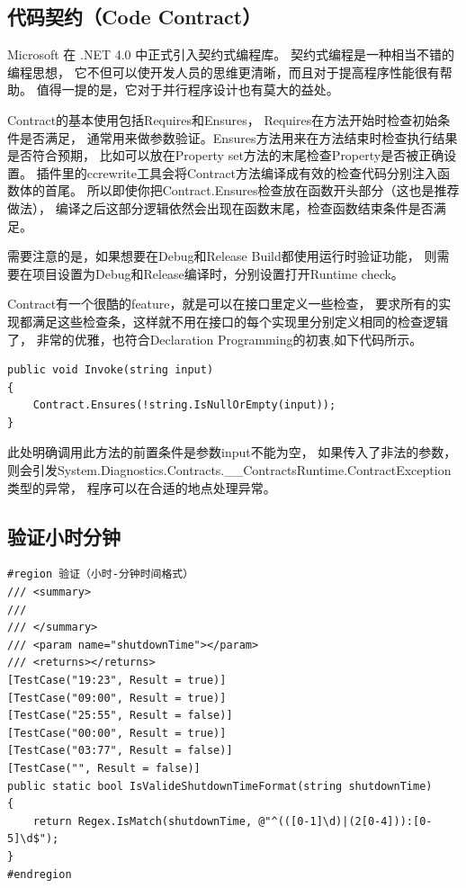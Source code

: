 \documentclass{book}
\begin{document}
\subsection{代码契约（Code Contract）}

Microsoft 在 .NET 4.0 中正式引入契约式编程库。
契约式编程是一种相当不错的编程思想，
它不但可以使开发人员的思维更清晰，而且对于提高程序性能很有帮助。
值得一提的是，它对于并行程序设计也有莫大的益处。 

Contract的基本使用包括Requires和Ensures，
Requires在方法开始时检查初始条件是否满足，
通常用来做参数验证。Ensures方法用来在方法结束时检查执行结果是否符合预期，
比如可以放在Property set方法的末尾检查Property是否被正确设置。 
插件里的ccrewrite工具会将Contract方法编译成有效的检查代码分别注入函数体的首尾。
所以即使你把Contract.Ensures检查放在函数开头部分（这也是推荐做法），
编译之后这部分逻辑依然会出现在函数末尾，检查函数结束条件是否满足。

需要注意的是，如果想要在Debug和Release Build都使用运行时验证功能，
则需要在项目设置为Debug和Release编译时，分别设置打开Runtime check。

Contract有一个很酷的feature，就是可以在接口里定义一些检查，
要求所有的实现都满足这些检查条，这样就不用在接口的每个实现里分别定义相同的检查逻辑了，
非常的优雅，也符合Declaration Programming的初衷,如下代码所示。

\begin{lstlisting}[language={[Sharp]C}]
public void Invoke(string input)
{
    Contract.Ensures(!string.IsNullOrEmpty(input));
}
\end{lstlisting}

此处明确调用此方法的前置条件是参数input不能为空，
如果传入了非法的参数，
则会引发System.Diagnostics.Contracts.\_\_ContractsRuntime.ContractException类型的异常，
程序可以在合适的地点处理异常。

\subsection{验证小时分钟}

\begin{lstlisting}[language={[Sharp]C}]
#region 验证（小时-分钟时间格式）
/// <summary>
/// 
/// </summary>
/// <param name="shutdownTime"></param>
/// <returns></returns>
[TestCase("19:23", Result = true)]
[TestCase("09:00", Result = true)]
[TestCase("25:55", Result = false)]
[TestCase("00:00", Result = true)]
[TestCase("03:77", Result = false)]
[TestCase("", Result = false)]
public static bool IsValideShutdownTimeFormat(string shutdownTime)
{
    return Regex.IsMatch(shutdownTime, @"^(([0-1]\d)|(2[0-4])):[0-5]\d$");
}
#endregion
\end{lstlisting}
\end{document}
